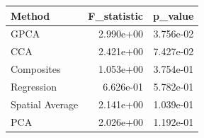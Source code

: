 \begin{tabular}{lrr}
\toprule
Method & F_statistic & p_value \\
\midrule
GPCA & 2.990e+00 & 3.756e-02 \\
CCA & 2.421e+00 & 7.427e-02 \\
Composites & 1.053e+00 & 3.754e-01 \\
Regression & 6.626e-01 & 5.782e-01 \\
Spatial Average & 2.141e+00 & 1.039e-01 \\
PCA & 2.026e+00 & 1.192e-01 \\
\bottomrule
\end{tabular}
